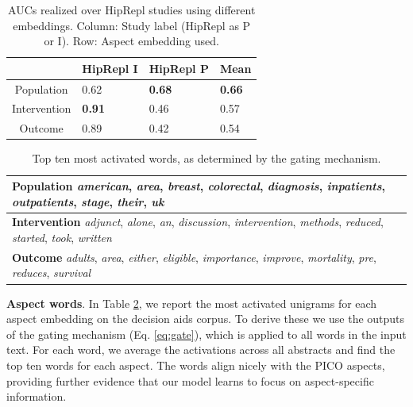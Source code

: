 \documentclass[11pt,a4paper]{article}
\begin{document}
\begin{table}
\small
\begin{tabularx}{\columnwidth}{c|X X X}
& HipRepl I & HipRepl P & Mean \\ \hline
Population & 0.62 & \textbf{0.68} & \textbf{0.66} \\ 
Intervention & \textbf{0.91} & 0.46 & 0.57 \\ 
Outcome & 0.89 & 0.42 & 0.54 \\ 
\end{tabularx}
\caption{AUCs realized over HipRepl studies using different embeddings. Column: Study label (HipRepl as P or I). Row: Aspect embedding used.}
\label{table:pubmed-AUCS}
\end{table}

\begin{table}%
\small
\centering
\begin{tabularx}{\columnwidth}{X}
{\bf Population} \emph{american}, \emph{area}, \emph{breast}, \emph{colorectal}, \emph{diagnosis}, \emph{inpatients}, \emph{outpatients}, \emph{stage}, \emph{their}, \emph{uk} \\ \hline
{\bf Intervention} \emph{adjunct}, \emph{alone}, \emph{an}, \emph{discussion}, \emph{intervention}, \emph{methods}, \emph{reduced}, \emph{started}, \emph{took}, \emph{written} \\ \hline
{\bf Outcome} \emph{adults}, \emph{area}, \emph{either}, \emph{eligible}, \emph{importance}, \emph{improve}, \emph{mortality}, \emph{pre}, \emph{reduces}, \emph{survival} \\ %
\end{tabularx}
\caption{Top ten most activated words, as determined by the gating mechanism.}
\label{table:picomost}
\vspace{-1em}
\end{table}

\vspace{.15em}
\noindent \textbf{Aspect words}. In Table \ref{table:picomost}, we report the most activated unigrams for each aspect embedding on the decision aids corpus. To derive these we use the outputs of the gating mechanism (Eq. \ref{eq:gate}), which is applied to all words in the input text. For each word, we average the activations across all abstracts and find the top ten words for each aspect. The words align nicely with the PICO aspects, providing further evidence that our model learns to focus on aspect-specific information. %
\end{document}
